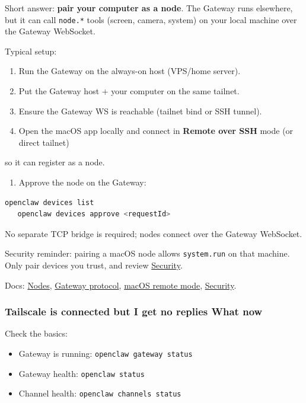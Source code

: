 Short answer: \textbf{pair your computer as a node}. The Gateway runs elsewhere, but it can
call \texttt{node.*} tools (screen, camera, system) on your local machine over the Gateway WebSocket.

Typical setup:

\begin{enumerate}
  \item Run the Gateway on the always-on host (VPS/home server).
  \item Put the Gateway host + your computer on the same tailnet.
  \item Ensure the Gateway WS is reachable (tailnet bind or SSH tunnel).
  \item Open the macOS app locally and connect in \textbf{Remote over SSH} mode (or direct tailnet)
\end{enumerate}

so it can register as a node.
\begin{enumerate}
  \item Approve the node on the Gateway:
\end{enumerate}


\begin{lstlisting}[language=bash]
   openclaw devices list
   openclaw devices approve <requestId>
\end{lstlisting}


No separate TCP bridge is required; nodes connect over the Gateway WebSocket.

Security reminder: pairing a macOS node allows \texttt{system.run} on that machine. Only
pair devices you trust, and review \href{/gateway/security}{Security}.

Docs: \href{/nodes}{Nodes}, \href{/gateway/protocol}{Gateway protocol}, \href{/platforms/mac/remote}{macOS remote mode}, \href{/gateway/security}{Security}.

\subsubsection{Tailscale is connected but I get no replies What now}


Check the basics:

\begin{itemize}
  \item Gateway is running: \texttt{openclaw gateway status}
  \item Gateway health: \texttt{openclaw status}
  \item Channel health: \texttt{openclaw channels status}
\end{itemize}


